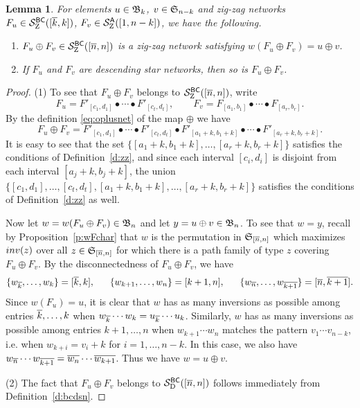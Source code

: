 \documentclass[11pt]{article}
\newtheorem{lem}[theo]{Lemma}
\theoremstyle{definition}
\numberwithin{equation}{section}
\begin{document}
\begin{lem}\label{l:opluszz}
  For elements $u \in \mathfrak{B}_{k}$, $v \in \mathfrak{S}_{n-k}$
  and zig-zag networks
  $F_u \in \mathcal S^{\mathsf{BC}}_{\mathrm Z}([\overline{k}, k])$,
  $F_v \in \mathcal S^{\mathsf{A}}_{\mathrm Z}([1,n-k])$,
  we have the following.
  \begin{enumerate}
  \item $F_u \oplus F_v \in \mathcal S^{\mathsf{BC}}_{\mathrm Z}([\overline{n}, n])$ is a zig-zag network
    satisfying $w(F_u \oplus F_v) = u \oplus v$.
  \item If $F_u$ and $F_v$ are descending star networks, then so is
    $F_u \oplus F_v$.
  \end{enumerate}
\end{lem}
\begin{proof}
  (1) To see that $F_u \oplus F_v$ belongs to $\mathcal S^{\mathsf{BC}}_{\mathrm Z}([\overline{n}, n])$, write
  \begin{equation*}
      F_u = F'_{[c_1,d_1]} \bullet \cdots \bullet F'_{[c_t,d_t]}, \qquad
      F_v = F_{[a_1,b_1]} \bullet \cdots \bullet F_{[a_r,b_r]}.
  \end{equation*}
  By the definition \eqref{eq:oplusnet} of the map $\oplus$ we have
  \begin{equation*}
    F_u \oplus F_v = F'_{[c_1,d_1]} \bullet \cdots \bullet F'_{[c_t,d_t]}
    \bullet F'_{[a_1+k,b_1+k]} \bullet \cdots \bullet F'_{[a_r+k,b_r+k]}.
  \end{equation*}
  It is easy to see that the set $\{[a_1+k,b_1+k],\dotsc,[a_r+k,b_r+k]\}$
  satisfies the conditions of Definition~\ref{d:zz},
  and since each interval $[c_i,d_i]$ is disjoint
  from each interval $[a_j+k,b_j+k]$, the union
  $\{[c_1,d_1],\dotsc,[c_t,d_t],[a_1+k,b_1+k], \dotsc, [a_r+k,b_r+k]\}$
  satisfies the conditions of Definition~\ref{d:zz} as well.

  Now let $w = w(F_u \oplus F_v) \in \mathfrak{B}_n$ and let $y = u \oplus v \in \mathfrak{B}_n$.
  To see that $w = y$,
  recall by Proposition~\ref{p:wFchar}
  that $w$ is the permutation in $\mathfrak{S}_{\smash{[\overline{n}, n]}}$
  which maximizes $\inv(z)$ over all $z \in \mathfrak{S}_{\smash{[\overline{n}, n]}}$
  for which there is a path family of type $z$ covering $F_u \oplus F_v$.
  By the disconnectedness of $F_u \oplus F_v$, we have
  \begin{equation*}
    \{w_{\overline{k}}, \dotsc, w_k \} = [\overline{k}, k],
    \qquad
    \negthickspace\kern-0.08333em\{w_{k+1}, \dotsc, w_n \} = [k+1,n],
    \qquad
    \negthickspace\kern-0.08333em\{w_{\overline{n}}, \dotsc, w_{\overline{k+1}} \} = [\overline{n}, \overline{k+1}].
  \end{equation*}
  Since $w(F_u) = u$, it is clear that $w$ has as many inversions as possible
  among entries $\overline{k}, \dotsc, k$ when
  $w_{\overline{k}} \cdots w_k = u_{\overline{k}} \cdots u_k$.
  Similarly,
  $w$ has as many inversions as possible
  among entries $k+1, \dotsc, n$ when
  $w_{k+1} \cdots w_n$ matches the pattern $v_1 \cdots v_{n-k}$, i.e.   when $w_{k+i} = v_i + k$ for $i = 1,\dotsc,n-k$.
  In this case,
  we also have
  $w_{\overline{n}} \cdots w_{\overline{k+1}} = \overline{w_n} \cdots \overline{w_{k+1}}$.
  Thus we have $w = u \oplus v$.

  (2) The fact that $F_u \oplus F_v$ belongs to $\mathcal S^{\mathsf{BC}}_{\mathrm D}([\overline{n},n])$
  follows immediately from Definition~\ref{d:bcdsn}.
\end{proof}
\end{document}
